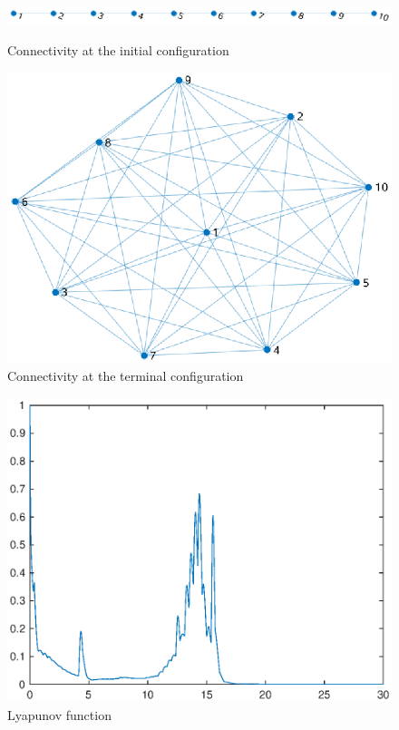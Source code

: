 \documentclass[a4paper,10pt, english]{article}
\begin{document}
\begin{figure}[ht]
  \begin{minipage}[b]{0.5\textwidth}
    \includegraphics[width=\textwidth]{figures/a10D_L+V_fine_mesh_NICE_cg0.eps}
    \caption{Connectivity at the initial configuration}
    \label{g01}
  \end{minipage}
  \hfill
  \begin{minipage}[b]{0.5\textwidth}
    \includegraphics[width=\textwidth]{figures/a10D_L+V_fine_mesh_NICE_cgT.eps}
    \caption{Connectivity at the terminal configuration}
    \label{gT1}
  \end{minipage}
\end{figure}
  
 
 \begin{figure}[ht]
 \centering
 \includegraphics[scale=0.5]{figures/a10D_L+V_fine_mesh_NICE_lv.eps}
 \caption{Lyapunov function}
 \label{lf1}
 \end{figure}
  \newpage
\end{document}
